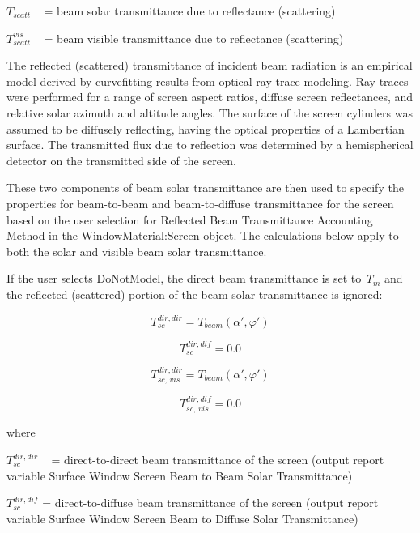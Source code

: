 \({T_{scatt}}\) ~ = beam solar transmittance due to reflectance (scattering)

\(T_{scatt}^{vis}\) ~ = beam visible transmittance due to reflectance (scattering)

The reflected (scattered) transmittance of incident beam radiation is an empirical model derived by curvefitting results from optical ray trace modeling. Ray traces were performed for a range of screen aspect ratios, diffuse screen reflectances, and relative solar azimuth and altitude angles. The surface of the screen cylinders was assumed to be diffusely reflecting, having the optical properties of a Lambertian surface. The transmitted flux due to reflection was determined by a hemispherical detector on the transmitted side of the screen.

These two components of beam solar transmittance are then used to specify the properties for beam-to-beam and beam-to-diffuse transmittance for the screen based on the user selection for Reflected Beam Transmittance Accounting Method in the WindowMaterial:Screen object. The calculations below apply to both the solar and visible beam solar transmittance.

If the user selects DoNotModel, the direct beam transmittance is set to \emph{T\(_{m}\)} and the reflected (scattered) portion of the beam solar transmittance is ignored:

\begin{equation}
T_{sc}^{dir,dir} = {T_{beam}}\left( {\alpha ',\varphi '} \right)
\end{equation}

\begin{equation}
T_{sc}^{dir,dif} = 0.0
\end{equation}

\begin{equation}
T_{sc,\,vis}^{dir,dir} = {T_{beam}}\left( {\alpha ',\varphi '} \right)
\end{equation}

\begin{equation}
T_{sc,\,vis}^{dir,dif} = 0.0
\end{equation}

where

\(T_{sc}^{dir,dir}\) ~ = direct-to-direct beam transmittance of the screen (output report variable Surface Window Screen Beam to Beam Solar Transmittance)

\(T_{sc}^{dir,dif}\) = direct-to-diffuse beam transmittance of the screen (output report variable Surface Window Screen Beam to Diffuse Solar Transmittance)

